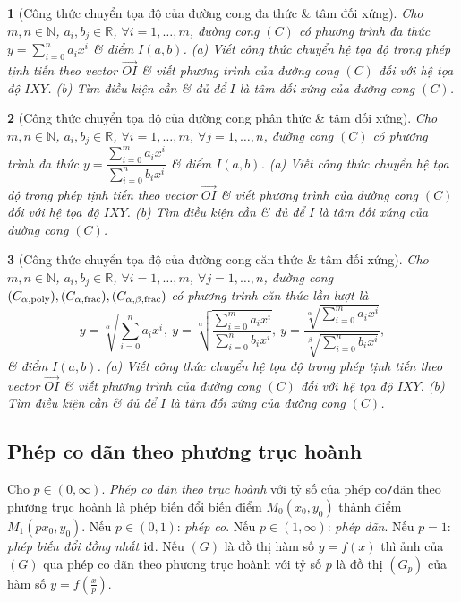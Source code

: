 \documentclass{article}
\newtheorem{baitoan}{}
\begin{document}
\begin{baitoan}[Công thức chuyển tọa độ của đường cong đa thức \& tâm đối xứng]
	Cho $m,n\in\mathbb{N}$, $a_i,b_j\in\mathbb{R}$, $\forall i = 1,\ldots,m$, đường cong $(C)$ có phương trình đa thức $y = \sum_{i=0}^n a_ix^i$ \& điểm $I(a,b)$. (a) Viết công thức chuyển hệ tọa độ trong phép tịnh tiến theo vector $\overrightarrow{OI}$ \& viết phương trình của đường cong $(C)$ đối với hệ tọa độ $IXY$. (b) Tìm điều kiện cần \& đủ để $I$ là tâm đối xứng của đường cong $(C)$.
\end{baitoan}

\begin{baitoan}[Công thức chuyển tọa độ của đường cong phân thức \& tâm đối xứng]
	Cho $m,n\in\mathbb{N}$, $a_i,b_j\in\mathbb{R}$, $\forall i = 1,\ldots,m$, $\forall j = 1,\ldots,n$, đường cong $(C)$ có phương trình đa thức $y = \dfrac{\sum_{i=0}^m a_ix^i}{\sum_{i=0}^n b_ix^i}$ \& điểm $I(a,b)$. (a) Viết công thức chuyển hệ tọa độ trong phép tịnh tiến theo vector $\overrightarrow{OI}$ \& viết phương trình của đường cong $(C)$ đối với hệ tọa độ $IXY$. (b) Tìm điều kiện cần \& đủ để $I$ là tâm đối xứng của đường cong $(C)$.
\end{baitoan}

\begin{baitoan}[Công thức chuyển tọa độ của đường cong căn thức \& tâm đối xứng]
	Cho $m,n\in\mathbb{N}$, $a_i,b_j\in\mathbb{R}$, $\forall i = 1,\ldots,m$, $\forall j = 1,\ldots,n$, đường cong $(C_{\alpha,{\rm poly}}),(C_{\alpha,{\rm frac}}),(C_{\alpha,\beta,{\rm frac}})$ có phương trình căn thức lần lượt là
	\begin{equation*}
		y = \sqrt[\alpha]{\sum_{i=0}^n a_ix^i},\ y = \sqrt[\alpha]{\dfrac{\sum_{i=0}^m a_ix^i}{\sum_{i=0}^n b_ix^i}},\ y = \dfrac{\sqrt[\alpha]{\sum_{i=0}^m a_ix^i}}{\sqrt[\beta]{\sum_{i=0}^n b_ix^i}},
	\end{equation*}
	\& điểm $I(a,b)$. (a) Viết công thức chuyển hệ tọa độ trong phép tịnh tiến theo vector $\overrightarrow{OI}$ \& viết phương trình của đường cong $(C)$ đối với hệ tọa độ $IXY$. (b) Tìm điều kiện cần \& đủ để $I$ là tâm đối xứng của đường cong $(C)$.
\end{baitoan}

\subsection{Phép co dãn theo phương trục hoành}
Cho $p\in(0,\infty)$.  {\it Phép co dãn theo trục hoành} với tỷ số của phép co{\tt/}dãn theo phương trục hoành là phép biến đổi biến điểm $M_0(x_0,y_0)$ thành điểm $M_1(px_0,y_0)$. Nếu $p\in(0,1)$: {\it phép co}. Nếu $p\in(1,\infty)$: {\it phép dãn}. Nếu $p = 1$: {\it phép biến đổi đồng nhất} $\rm id$.  Nếu $(G)$ là đồ thị hàm số $y = f(x)$ thì ảnh của $(G)$ qua phép co dãn theo phương trục hoành với tỷ số $p$ là đồ thị $(G_p)$ của hàm số $y = f\left(\frac{x}{p}\right)$.
\end{document}
